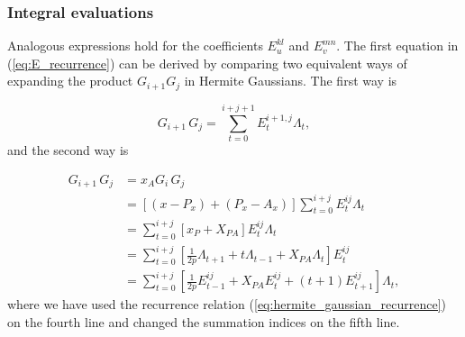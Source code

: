 \documentclass{beamer}
\begin{document}
\begin{frame}
\frametitle{Integral evaluations}

\begin{block}{}

Analogous expressions hold for the coefficients $E^{kl}_u$ and $E^{mn}_v$. The first equation in (\ref{eq:E_recurrence}) 
can be derived by comparing two equivalent ways of expanding the product $G_{i+1}G_j$
in Hermite Gaussians. The first way is

\begin{equation}
 G_{i+1}\,G_j= \sum_{t=0}^{i+j+1}E^{i+1,j}_t \Lambda_t,
\end{equation}
and the second way is

\begin{equation}
\label{eq:derivation_E_coeffs}
\begin{split}
 G_{i+1}\,G_j & = x_A G_i\,G_j \\
              & = [(x - P_x) + (P_x - A_x)]\sum_{t=0}^{i+j} E^{ij}_t \Lambda_t\\
              & = \sum_{t=0}^{i+j}[x_P + X_{PA}] E^{ij}_t \Lambda_t \\
              & = \sum_{t=0}^{i+j}[\frac{1}{2p}\Lambda_{t+1} + t\Lambda_{t-1} + X_{PA}\Lambda_t]E^{ij}_t \\
              & = \sum_{t=0}^{i+j}[\frac{1}{2p}E^{ij}_{t-1} + X_{PA}E^{ij}_t + (t+1)E^{ij}_{t+1}] \Lambda_t,
\end{split}
\end{equation}
where we have used the recurrence relation (\ref{eq:hermite_gaussian_recurrence}) on the fourth line and changed the 
summation indices on the fifth line. 
\end{block}
\end{frame}
\end{document}
